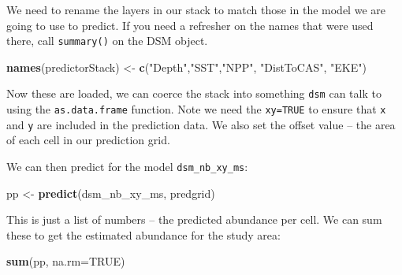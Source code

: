 \documentclass[]{book}
\newenvironment{Shaded}{\begin{snugshade}}{\end{snugshade}}
\newcommand{\KeywordTok}[1]{\textcolor[rgb]{0.13,0.29,0.53}{\textbf{#1}}}
\newcommand{\DataTypeTok}[1]{\textcolor[rgb]{0.13,0.29,0.53}{#1}}
\newcommand{\DecValTok}[1]{\textcolor[rgb]{0.00,0.00,0.81}{#1}}
\newcommand{\StringTok}[1]{\textcolor[rgb]{0.31,0.60,0.02}{#1}}
\newcommand{\OtherTok}[1]{\textcolor[rgb]{0.56,0.35,0.01}{#1}}
\newcommand{\OperatorTok}[1]{\textcolor[rgb]{0.81,0.36,0.00}{\textbf{#1}}}
\newcommand{\NormalTok}[1]{#1}
\theoremstyle{definition}
\theoremstyle{definition}
\theoremstyle{remark}
\begin{document}
We need to rename the layers in our stack to match those in the model we
are going to use to predict. If you need a refresher on the names that
were used there, call \texttt{summary()} on the DSM object.

\begin{Shaded}
\begin{Highlighting}[]
\KeywordTok{names}\NormalTok{(predictorStack) <-}\StringTok{ }\KeywordTok{c}\NormalTok{(}\StringTok{"Depth"}\NormalTok{,}\StringTok{"SST"}\NormalTok{,}\StringTok{"NPP"}\NormalTok{, }\StringTok{"DistToCAS"}\NormalTok{, }\StringTok{"EKE"}\NormalTok{)}
\end{Highlighting}
\end{Shaded}

Now these are loaded, we can coerce the stack into something
\texttt{dsm} can talk to using the \texttt{as.data.frame} function. Note
we need the \texttt{xy=TRUE} to ensure that \texttt{x} and \texttt{y}
are included in the prediction data. We also set the offset value -- the
area of each cell in our prediction grid.

\begin{Shaded}
\end{Shaded}

We can then predict for the model \texttt{dsm\_nb\_xy\_ms}:

\begin{Shaded}
\begin{Highlighting}[]
\NormalTok{pp <-}\StringTok{ }\KeywordTok{predict}\NormalTok{(dsm_nb_xy_ms, predgrid)}
\end{Highlighting}
\end{Shaded}

This is just a list of numbers -- the predicted abundance per cell. We
can sum these to get the estimated abundance for the study area:

\begin{Shaded}
\begin{Highlighting}[]
\KeywordTok{sum}\NormalTok{(pp, }\DataTypeTok{na.rm=}\OtherTok{TRUE}\NormalTok{)}
\end{Highlighting}
\end{Shaded}
\end{document}
